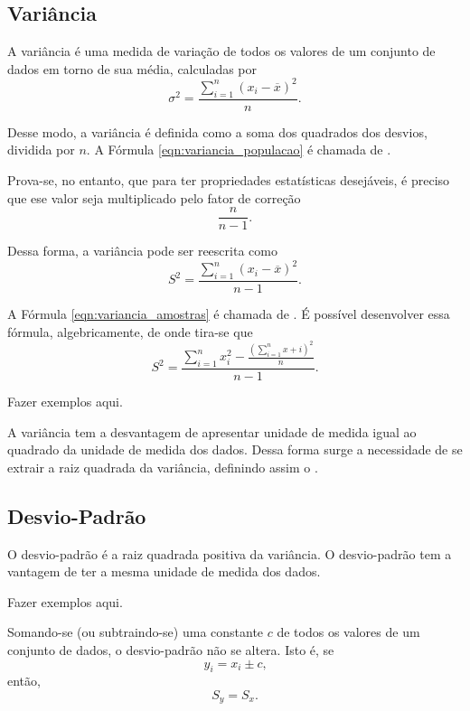 \documentclass[11pt,fleqn]{book}
\numberwithin{mpicture}{chapter}
\numberwithin{mtable}{chapter}
\numberwithin{mframe}{chapter}
\begin{document}
\subsection{Variância}

A variância é uma medida de variação de todos os valores de um conjunto de dados em torno de sua média, calculadas por
\begin{equation}
	\label{eqn:variancia_populacao}
	\sigma ^2 = \frac{
		\displaystyle \sum_{i=1}^{n} (x_i - \overline{x})^2
	} {
		n
	} \text{.}
\end{equation}

Desse modo, a variância é definida como a soma dos quadrados dos desvios, dividida por $n$. A Fórmula \ref{eqn:variancia_populacao} é chamada de .

Prova-se, no entanto, que para ter propriedades estatísticas desejáveis, é preciso que ese valor seja multiplicado pelo fator de correção
\[
	\frac{n}{n-1}
	\text{.}
\]

Dessa forma, a variância pode ser reescrita como
\begin{equation}
	\label{eqn:variancia_amostras}
	S^2=\frac{
		\displaystyle \sum_{i=1}^{n} (x_i - \overline{x})^2
	} {
		n-1
	}\text{.}
\end{equation}

A Fórmula \ref{eqn:variancia_amostras} é chamada de . É possível desenvolver essa fórmula, algebricamente, de onde tira-se que
\[
	S^2=\frac{
		\displaystyle \sum_{i=1}^{n} x_i^2
		-
		\displaystyle \frac{
			\left (
				\displaystyle \sum_{i=1}^{n} x+i
			\right ) ^2
		}{n}
	} {
		n-1
	}
	\text{.}
\]

{\color{red}Fazer exemplos aqui.}

A variância tem a desvantagem de apresentar unidade de medida igual ao quadrado da unidade de medida dos dados. Dessa forma surge a necessidade de se extrair a raiz quadrada da variância, definindo assim o .

\subsection{Desvio-Padrão}

O desvio-padrão é a raiz quadrada positiva da variância. O desvio-padrão tem a vantagem de ter a mesma unidade de  medida dos dados.

{\color{red}Fazer exemplos aqui.}

\begin{theorem}
	Somando-se (ou subtraindo-se) uma constante $c$ de todos os valores de um conjunto de dados, o desvio-padrão não se altera. Isto é, se
	\[
		y_i=x_i\pm c\text{,}
	\]
	então,
	\[
		S_y=S_x\text{.}
	\]
\end{theorem}
\end{document}
